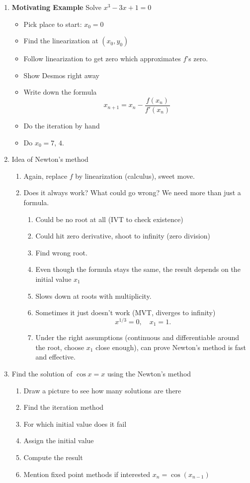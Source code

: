 \documentclass{article}
\begin{document}
\begin{enumerate}
\item {\bf Motivating Example} Solve $x^3-3x+1 = 0$
\begin{itemize}
\item Pick place to start: $x_0 = 0$
\item Find the linearization at $(x_0, y_0)$
\item Follow linearization to get zero which approximates $f$'s zero.
\item Show Desmos right away
\item Write down the formula
$$
x_{n+1} = x_n -\frac{f(x_n)}{f'(x_n)}
$$
\item Do the iteration by hand
\item Do $x_0 = 7$, $4$.
\end{itemize}

\item Idea of Newton's method
\begin{enumerate}
\item Again, replace $f$ by linearization (calculus), sweet move.
\item Does it always work? What could go wrong? We need more than just a formula.
\begin{enumerate}
\item Could be no root at all (IVT to check existence)
\item Could hit zero derivative, shoot to infinity (zero division)
\item Find wrong root. 
\item Even though the formula stays the same, the result depends on the initial value $x_1$
\item Slows down at roots with multiplicity.
\item Sometimes it just doesn't work (MVT, diverges to infinity)
$$
x^{1/3}=0, \quad x_1 = 1.
$$
\item Under the right assumptions (continuous and differentiable around the root, choose $x_1$ close enough), can prove Newton's method is fast and effective.
\end{enumerate}
\end{enumerate}

\item Find the solution of $\cos x = x$ using the Newton's method
\begin{enumerate}
\item Draw a picture to see how many solutions are there
\item Find the iteration method
\item For which initial value does it fail
\item Assign the initial value 
\item Compute the result
\item Mention fixed point methods if interested $x_n = \cos(x_{n-1})$
\end{enumerate}


\end{enumerate}
\end{document}
